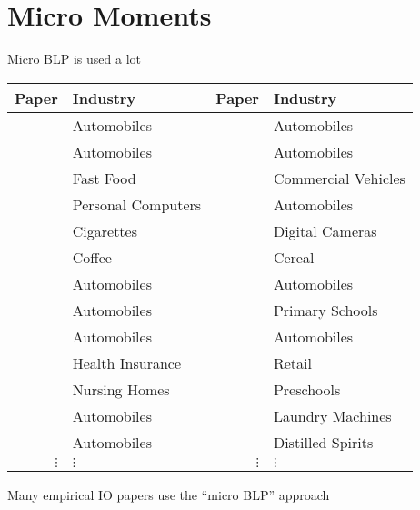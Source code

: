 \section{Micro Moments}

\begin{frame}{Micro BLP is used a lot}
    \vspace{0.5em}
    \scriptsize
    \begin{tabular}{rlrl}
        Paper & Industry & Paper & Industry \\
        \midrule
        \cite*{petrin2002quantifying} & Automobiles & \cite*{barwick2017local} & Automobiles \\
        \cite*{berry2004differentiated} & Automobiles & \cite*{murry2017advertising} & Automobiles \\
        \cite*{thomadsen2005effect} & Fast Food & \cite*{wollmann2018trucks} & Commercial Vehicles \\
        \cite*{goeree2008limited} & Personal Computers & \cite*{li2018better} & Automobiles \\
        \cite*{ciliberto2010public} & Cigarettes & \cite*{li2018empirical} & Digital Cameras \\
        \cite*{nakamura2010accounting} & Coffee & \cite*{backus2021common} & Cereal \\
        \cite*{beresteanu2011gasoline} & Automobiles & \cite*{grieco2021evolution} & Automobiles \\
        \cite*{li2012traffic} & Automobiles & \cite*{neilson2021targeted} & Primary Schools \\
        \cite*{copeland2014intertemporal} & Automobiles & \cite*{armitage2022regulatory} & Automobiles \\
        \cite*{starc2014insurer} & Health Insurance & \cite*{dopper2022rising} & Retail \\
        \cite*{ching2015quantifying} & Nursing Homes & \cite*{bodere2023dynamic} & Preschools \\
        \cite*{li2015price} & Automobiles & \cite*{montag2023mergers} & Laundry Machines \\
        \cite*{nurski2016exclusive} & Automobiles & \cite*{conlon2023market} & Distilled Spirits \\
        $\vdots$ & $\vdots$ & $\vdots$ & $\vdots$
    \end{tabular}
    \normalsize
    \vspace{0.5em}
    \begin{wideitemize}
        \item Many empirical IO papers use the ``micro BLP'' approach

\end{wideitemize}
\end{frame}
